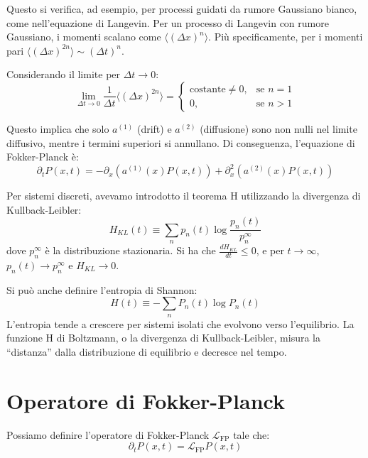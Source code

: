 Questo si verifica, ad esempio, per processi guidati da rumore Gaussiano bianco, come nell'equazione di Langevin. Per un processo di Langevin con rumore Gaussiano, i momenti scalano come $\langle(\Delta x)^{n}\rangle$. Più specificamente, per i momenti pari $\langle(\Delta x)^{2n}\rangle \sim (\Delta t)^{n}$.

Considerando il limite per $\Delta t \rightarrow 0$:
\begin{equation}
\lim_{\Delta t\rightarrow0}\frac{1}{\Delta t}\langle(\Delta x)^{2n}\rangle =
\begin{cases}
\text{costante} \neq 0, & \text{se } n=1 \\
0, & \text{se } n>1
\end{cases}
\end{equation}

Questo implica che solo $a^{(1)}$ (drift) e $a^{(2)}$ (diffusione) sono non nulli nel limite diffusivo, mentre i termini superiori si annullano. Di conseguenza, l'equazione di Fokker-Planck è:
\begin{equation}
\partial_{t}P(x,t)=-\partial_{x}(a^{(1)}(x)P(x,t))+\partial_{x}^{2}(a^{(2)}(x)P(x,t))
\end{equation}

Per sistemi discreti, avevamo introdotto il teorema H utilizzando la divergenza di Kullback-Leibler:
\begin{equation}
H_{KL}(t) \equiv \sum_{n} p_{n}(t) \log\frac{p_{n}(t)}{p_{n}^{\infty}}
\end{equation}
dove $p_n^{\infty}$ è la distribuzione stazionaria. Si ha che $\frac{dH_{KL}}{dt} \le 0$, e per $t\rightarrow\infty$, $p_{n}(t)\rightarrow p_{n}^{\infty}$ e $H_{KL} \rightarrow 0$.

Si può anche definire l'entropia di Shannon:
\begin{equation}
H(t) \equiv -\sum_{n} P_{n}(t) \log P_{n}(t)
\end{equation}
L'entropia tende a crescere per sistemi isolati che evolvono verso l'equilibrio. La funzione H di Boltzmann, o la divergenza di Kullback-Leibler, misura la ``distanza'' dalla distribuzione di equilibrio e decresce nel tempo.

\section{Operatore di Fokker-Planck}
Possiamo definire l'operatore di Fokker-Planck $\mathcal{L}_{\text{FP}}$ tale che:
\begin{equation}
\partial_{t}P(x,t) = \mathcal{L}_{\text{FP}}P(x,t)
\end{equation}


